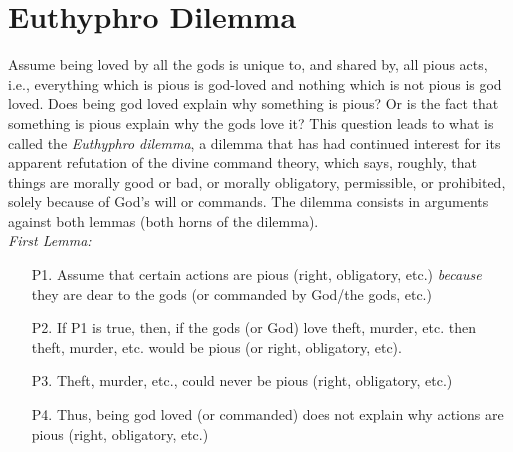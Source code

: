 \documentclass[oneside]{article}
\begin{document}
\section*{Euthyphro Dilemma}


Assume being loved by all the gods is unique to, and shared by, all pious acts, i.e., everything which is pious is god-loved and nothing which is not pious is god loved. Does being god loved explain why something is pious? Or is the fact that something is pious explain why the gods love it? This question leads to what is called the \emph{Euthyphro dilemma}, a dilemma that has had continued interest for its apparent refutation of the divine command theory, which says, roughly, that things are morally good or bad, or morally obligatory, permissible, or prohibited, solely because of God’s will or commands. The dilemma consists in arguments against both lemmas (both horns of the dilemma).\\

\noindent \emph{First Lemma:}

\begin{enumerate}
\item[P1.] Assume that certain actions are pious (right,  obligatory, etc.) \emph{because} they are dear to the gods (or commanded by God/the gods, etc.)
\item[P2.] If P1 is true, then, if the gods (or God) love theft, murder, etc. then theft, murder, etc. would be pious (or right, obligatory, etc). 
\item[P3.] Theft, murder, etc., could never be pious (right, obligatory, etc.) 
\item[P4.] Thus, being god loved (or commanded) does not explain why actions are pious (right, obligatory, etc.)
\end{enumerate}
\end{document}
